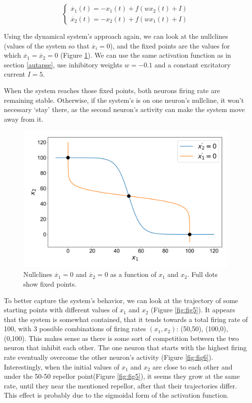 \documentclass{article}
\begin{document}
\begin{equation}\label{eq:5}
  \begin{cases}
    \dot{x_1}(t) = -x_1(t) + f(wx_2(t) +I)\\
    \dot{x_2}(t) = -x_2(t) + f(wx_1(t) +I)
  \end{cases}
\end{equation}

Using the dynamical system's approach again, we can look at the nullclines (values of the system so that $\dot{x_i}=0$), and the fixed points are the values for which $\dot{x_1} = \dot{x_2} =0$ (Figure \ref{fig:fig4}). We can use the same activation function as in section \ref{autapse}, use inhibitory weights $w=-0.1$ and a constant excitatory current $I=5$.

 When the system reaches those fixed points, both  neurons firing rate are remaining stable. Otherwise, if the system's is on one neuron's nullcline, it won't necessary `stay' there, as the second neuron's activity can make the system move away from it.

\begin{figure}[H]
\centering
\includegraphics[width=.8\linewidth]{exercice5fig4.png}
\caption[spt]{Nullclines $\dot{x_1}=0$ and $\dot{x_2}=0$ as a function of $x_1$ and $x_2$. Full dots show fixed points.}\label{fig:fig4}
\end{figure}

To better capture the system's behavior, we can look at the trajectory of some starting points with different values of $x_1$ and $x_2$ (Figure \ref{fig:fig5}). It appears that the system is somewhat contained, that it tends towards a total firing rate of 100, with 3 possible combinations of firing rates $(x_1, x_2)$: (50,50), (100,0), (0,100). This makes sense as there is some sort of competition between the two neuron that inhibit each other. The one neuron that starts with the highest firing rate eventually overcome the other neuron's activity (Figure \ref{fig:fig6}). Interestingly, when the initial values of $x_1$ and $x_2$ are close to each other and under the 50-50 repellor point(Figure \ref{fig:fig5}), it seems they grow at the same rate, until they near the mentioned repellor, after that their trajectories differ. This effect is probably due to the sigmoidal form of the activation function. \\
\end{document}
